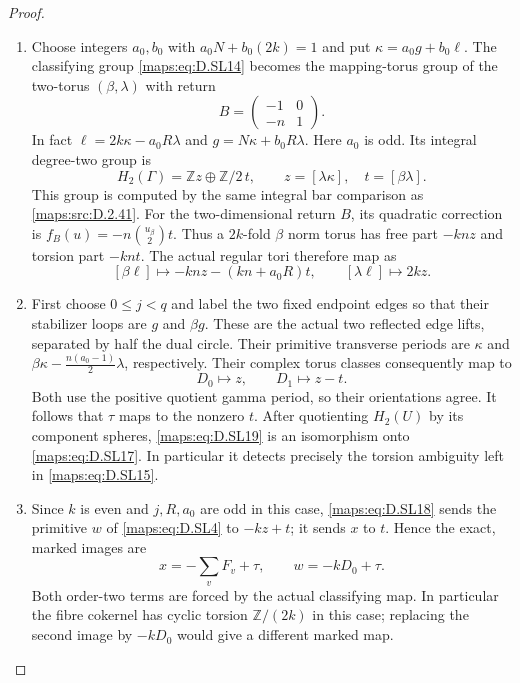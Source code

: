 \begin{proof}
\begin{enumerate}[label=\arabic*.,leftmargin=*]
\item Choose integers $a_0,b_0$ with
$a_0N+b_0(2k)=1$ and put
$\kappa=a_0g+b_0\ell$. The classifying
group \eqref{maps:eq:D.SL14} becomes the mapping-torus
group of the two-torus $(\beta,\lambda)$
with return
\[
           B=\begin{pmatrix}-1&0\\-n&1\end{pmatrix}.
\]
In fact
$\ell=2k\kappa-a_0R\lambda$ and
$g=N\kappa+b_0R\lambda$.
Here $a_0$ is odd. Its integral degree-two
group is
\[
 H_2(\Gamma)=\mathbb Zz\oplus\mathbb Z/2\,t,
       \qquad z=[\lambda\kappa],\quad t=[\beta\lambda].
                                                               \tag{D.SL17}\label{maps:eq:D.SL17}
\]
This group is computed by the same integral
bar comparison as \ref{maps:src:D.2.41}. For the two-dimensional
return $B$, its quadratic correction is
$f_B(u)=-n\binom{u_\beta}{2}t$.
Thus a $2k$-fold $\beta$ norm torus has
free part $-knz$ and torsion part $-knt$.
The actual regular tori therefore map as
\[
 [\beta\ell]\longmapsto-knz-(kn+a_0R)t,
 \qquad [\lambda\ell]\longmapsto2kz.                     \tag{D.SL18}\label{maps:eq:D.SL18}
\]

\item First choose $0\le j<q$ and label the two fixed endpoint edges so that
their stabilizer loops are $g$ and $\beta g$.
These are the actual two reflected edge
lifts, separated by half the dual circle.
Their primitive transverse periods are
$\kappa$ and
$\beta\kappa-\frac{n(a_0-1)}2\lambda$, respectively.
Their complex torus classes consequently
map to
\[
                        D_0\mapsto z,\qquad D_1\mapsto z-t.
                                                               \tag{D.SL19}\label{maps:eq:D.SL19}
\]
Both use the positive quotient gamma period,
so their orientations agree. It follows
that $\tau$ maps to the nonzero $t$.
After quotienting $H_2(U)$ by its component
spheres, \eqref{maps:eq:D.SL19} is an isomorphism onto
\eqref{maps:eq:D.SL17}. In particular it detects precisely
the torsion ambiguity left in \eqref{maps:eq:D.SL15}.

\item Since $k$ is even and $j,R,a_0$ are odd
in this case, \eqref{maps:eq:D.SL18} sends the primitive
$w$ of \eqref{maps:eq:D.SL4} to $-kz+t$; it sends $x$
to $t$. Hence the exact, marked images are
\[
       x=-\sum_vF_v+\tau,\qquad
                         w=-kD_0+\tau.                   \tag{D.SL20}\label{maps:eq:D.SL20}
\]
Both order-two terms are forced by the
actual classifying map. In particular the
fibre cokernel has cyclic torsion
$\mathbb Z/(2k)$ in this case; replacing
the second image by $-kD_0$ would give a
different marked map.


\end{enumerate}
\end{proof}

